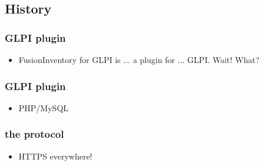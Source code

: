 %
%
\subsection{History}

\begin{frame}
\frametitle{GLPI plugin}
%
\begin{itemize}
\item FusionInventory for GLPI is ... a plugin for ... GLPI. Wait! What? 
%
\end{itemize}
\end{frame}

\begin{frame}
\frametitle{GLPI plugin}
%
\begin{itemize}
\item PHP/MySQL
%
\end{itemize}
\end{frame}

\begin{frame}
\frametitle{the protocol}
%
\begin{itemize}
\item HTTPS everywhere! 
%
\end{itemize}
\end{frame}



